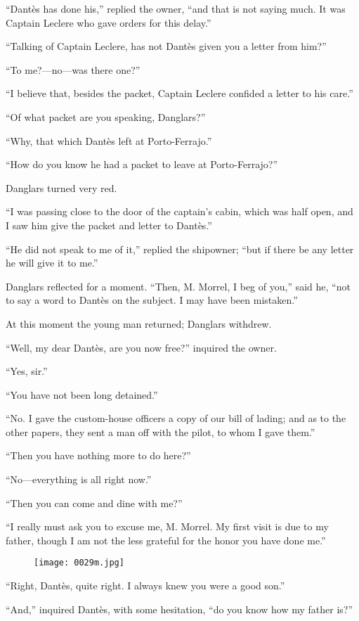 “Dantès has done his,” replied the owner, “and that is not saying much.
It was Captain Leclere who gave orders for this delay.”

“Talking of Captain Leclere, has not Dantès given you a letter from
him?”

“To me?—no—was there one?”

“I believe that, besides the packet, Captain Leclere confided a letter
to his care.”

“Of what packet are you speaking, Danglars?”

“Why, that which Dantès left at Porto-Ferrajo.”

“How do you know he had a packet to leave at Porto-Ferrajo?”

Danglars turned very red.

“I was passing close to the door of the captain’s cabin, which was half
open, and I saw him give the packet and letter to Dantès.”

“He did not speak to me of it,” replied the shipowner; “but if there be
any letter he will give it to me.”

Danglars reflected for a moment. “Then, M. Morrel, I beg of you,” said
he, “not to say a word to Dantès on the subject. I may have been
mistaken.”

At this moment the young man returned; Danglars withdrew.

“Well, my dear Dantès, are you now free?” inquired the owner.

“Yes, sir.”

“You have not been long detained.”

“No. I gave the custom-house officers a copy of our bill of lading; and
as to the other papers, they sent a man off with the pilot, to whom I
gave them.”

“Then you have nothing more to do here?”

“No—everything is all right now.”

“Then you can come and dine with me?”

“I really must ask you to excuse me, M. Morrel. My first visit is due
to my father, though I am not the less grateful for the honor you have
done me.”

\begin{figure}[h]
\texttt{[image: 0029m.jpg]}
\end{figure}

“Right, Dantès, quite right. I always knew you were a good son.”

“And,” inquired Dantès, with some hesitation, “do you know how my
father is?”

